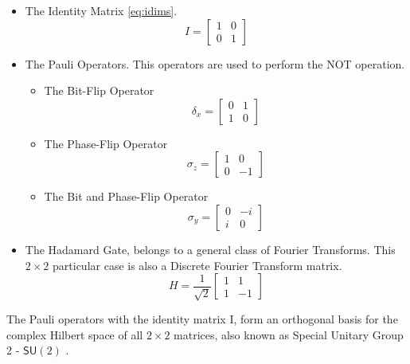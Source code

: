 \begin{itemize}
\item The Identity Matrix \ref{eq:idims}.
\begin{equation}
\label{eq:idims}
I=\left[\begin{array}{cc}
1 & 0\\
0 & 1
\end{array}\right]
\end{equation}

\item The Pauli Operators. This operators are used to perform the NOT operation. 
	\begin{itemize}
		\item The Bit-Flip Operator\begin{equation}
\label{eq:idims_1}
\delta_{x} =\left[\begin{array}{cc}
0 & 1\\
1 & 0
\end{array}\right]
\end{equation}
		\item The Phase-Flip Operator\begin{equation}
\label{eq:idims_2}
\sigma_{z} =\left[\begin{array}{cc}
1 & 0\\
0 & -1
\end{array}\right]
\end{equation}
\item The Bit and Phase-Flip Operator\begin{equation}
\label{eq:idims_3}
\sigma_{y}=\left[\begin{array}{cc}
0 & -i\\
i & 0
\end{array}\right]
\end{equation}
	\end{itemize}
\item The Hadamard Gate, belongs to a general class of Fourier Transforms. This $2\times 2$ particular case is also a Discrete Fourier Transform matrix.
\begin{equation}
\label{eq:idimssd_3}
H=\frac{1}{\sqrt{2}}\left[\begin{array}{cc}
1 & 1\\
1 & -1
\end{array}\right]
\end{equation}
\end{itemize}

The Pauli operators with the identity matrix I, form an orthogonal basis for the complex Hilbert space of all $2 \times 2$ matrices, also known as Special Unitary Group 2 - $\mathsf{SU}(2)$ \cite{Letters2002}.


